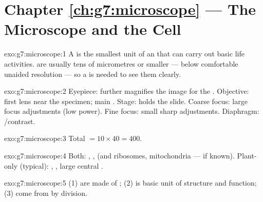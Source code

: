 \section*{Chapter \ref{ch:g7:microscope} --- The Microscope and the Cell}

\begin{solution}{exo:g7:microscope:1}
A  is the smallest unit of an  that can carry out basic life
activities.  are usually tens of micrometres or smaller --- below
comfortable unaided resolution --- so a  is needed to see them
clearly.
\end{solution}

\begin{solution}{exo:g7:microscope:2}
Eyepiece: further magnifies the image for the . Objective: first lens
near the specimen; main . Stage: holds the slide. Coarse
focus: large focus adjustments (low power). Fine focus: small sharp
adjustments. Diaphragm:  /contrast.
\end{solution}

\begin{solution}{exo:g7:microscope:3}
Total  $= 10 \times 40 = 400$.
\end{solution}

\begin{solution}{exo:g7:microscope:4}
Both: , ,  (and ribosomes, mitochondria ---
if known). Plant-only (typical): , , large central
.
\end{solution}

\begin{solution}{exo:g7:microscope:5}
(1)  are made of ; (2)  is basic unit of structure and
function; (3)  come from  by division.
\end{solution}

